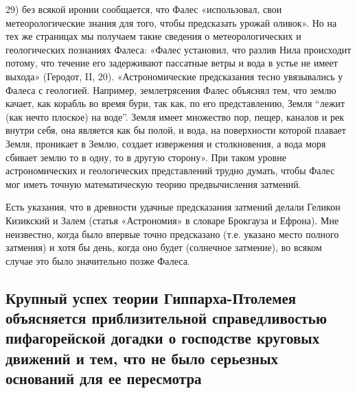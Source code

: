 29)  без  всякой  иронии  сообщается,  что  Фалес  «использовал,  свои
метеорологические знания  для того, чтобы предсказать  урожай оливок».
Но на тех же страницах  мы получаем такие сведения о метеорологических
и геологических  познаниях Фалеса:  «Фалес установил, что  разлив Нила
происходит  потому,  что течение  его  задерживают  пассатные ветры  и
вода  в устье  не имеет  выхода» (Геродот,  II, 20).  «Астрономические
предсказания  тесно  увязывались  у   Фалеса  с  геологией.  Например,
землетрясения Фалес  объяснял тем,  что землю  качает, как  корабль во
время бури,  так как, по  его представлению, Земля ``лежит  (как нечто
плоское) на  воде''. Земля имеет  множество пор, пещер, каналов  и рек
внутри себя, она является как бы полой, и вода, на поверхности которой
плавает Земля, проникает в Землю, создает извержения и столкновения, а
вода моря  сбивает землю то  в одну, то  в другую сторону».  При таком
уровне  астрономических и  геологических представлений  трудно думать,
чтобы  Фалес мог  иметь  точную  математическую теорию  предвычисления
затмений.

Есть указания,  что в  древности удачные предсказания  затмений делали
Геликон Кизикский и  Залем (статья «Астрономия» в  словаре Брокгауза и
Ефрона). Мне  неизвестно, когда  было впервые точно  предсказано (т.е.
указано  место полного  затмения)  и  хотя бы  день,  когда оно  будет
(солнечное  затмение), во  всяком  случае это  было значительно  позже
Фалеса.

\subsection{Крупный   успех   теории   Гиппарха-Птолемея   объясняется
приблизительной  справедливостью  пифагорейской догадки  о  господстве
круговых  движений и  тем,  что  не было  серьезных  оснований для  ее
пересмотра}

